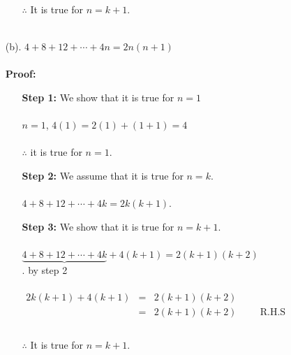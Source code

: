\documentclass[11pt,a4paper]{article}
\begin{document}
\begin{enumerate}
\begin{enumerate}
$\therefore$\hspace{1cm} It is true for $n=k+1$.\\\\
\end{enumerate}

\item[(b).] $4+8+12+\cdots +4n=2n(n+1)$\\\\
\textbf{Proof:}
\begin{enumerate}
\item[\textbf{Step 1:}] We show that it is true for $n=1$\\\\ 
$n=1$,\hspace{0.5cm} $4(1)=2(1)+(1+1)=4$\\\\
$\therefore$\hspace{1cm} it is true for $n=1$.\\

\item[\textbf{Step 2:}] We assume that it is true for $n=k$.\\\\
$4+8+12+\cdots +4k =2k(k+1).$\\
\item[\textbf{Step 3:}] We show that it is true for $n=k+1$.\\\\
$\underbrace{4+8+12+\cdots +4k}+4(k+1)=2(k+1)(k+2)$\\
.\hspace{1cm} by step 2\\\\
$
\begin{matrix}
2k(k+1)+4(k+1) & = & 2(k+1)(k+2)\\
& =&  2(k+1)(k+2)\hspace{1cm} \text{R.H.S}\\
\end{matrix}
$\\\\
$\therefore$\hspace{1cm} It is true for $n=k+1$.\\\\
\end{enumerate}


\end{enumerate}
\end{document}
